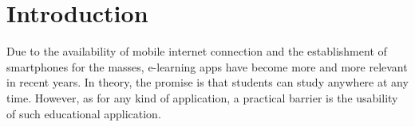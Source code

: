 \documentclass{sig-alternate-05-2015}
\begin{document}


%
%

%
%
\printccsdesc



\section{Introduction}
Due to the availability of mobile internet connection and the establishment of smartphones for the masses, e-learning apps have become more and more relevant in recent years.
In theory, the promise is that students can study anywhere at any time. However, as for any kind of application, a practical barrier is the usability of such educational application.
\end{document}

